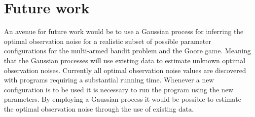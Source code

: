 \section{Future work}
An avenue for future work would be to use a Gaussian process for inferring the optimal observation noise for a realistic subset of possible parameter configurations for the multi-armed bandit problem and the Goore game.
Meaning that the Gaussian processes will use existing data to estimate unknown optimal observation noises.
Currently all optimal observation noise values are discovered with programs requiring a substantial running time.
Whenever a new configuration is to be used it is necessary to run the program using the new parameters.
By employing a Gaussian process it would be possible to estimate the optimal observation noise through the use of existing data.

